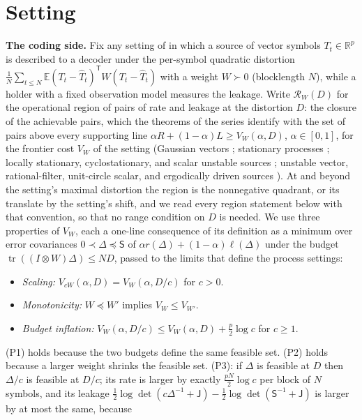 \documentclass[11pt,onecolumn]{IEEEtran}
\newcommand{\E}{\mathbb{E}}
\newcommand{\R}{\mathbb{R}}
\newcommand{\tr}{\operatorname{tr}}
\newcommand{\cR}{\mathcal R}
\begin{document}
\section{Setting}\label{sec:setting}

\textbf{The coding side.} Fix any setting of \cite{part1,part2,part3,part4}
in which a source of vector symbols $T_t\in\R^p$ is described to a decoder
under the per-symbol quadratic distortion
$\tfrac1N\sum_{t\le N}\E(T_t-\hat T_t)^{\mathsf T}W(T_t-\hat T_t)$ with a weight
$W\succ0$ (blocklength $N$), while a holder with a fixed observation model
measures the leakage. Write $\cR_W(D)$ for the operational region of pairs
of rate and leakage at the distortion $D$: the closure of the achievable
pairs, which the theorems of the series identify with the set of pairs
above every supporting line $\alpha R+(1-\alpha)L\ge V_W(\alpha,D)$,
$\alpha\in[0,1]$, for the frontier cost $V_W$ of the setting (Gaussian
vectors \cite{part1}; stationary processes \cite{part2}; locally stationary,
cyclostationary, and scalar unstable sources \cite{part3}; unstable vector,
rational-filter, unit-circle scalar, and ergodically driven sources
\cite{part4}). At and beyond the setting's maximal distortion the region is
the nonnegative quadrant, or its translate by the setting's shift, and we
read every region statement below with that convention, so that no range
condition on $D$ is needed. We use three properties of $V_W$, each a
one-line consequence of its definition as a minimum over error covariances
$0\prec\Delta\preceq\mathsf S$ of $\alpha r(\Delta)+(1-\alpha)\ell(\Delta)$ under
the budget $\tr((I\otimes W)\Delta)\le ND$, passed to the limits that define
the process settings:
\begin{itemize}
\item[(P1)] \emph{Scaling:} $V_{cW}(\alpha,D)=V_W(\alpha,D/c)$ for $c>0$.
\item[(P2)] \emph{Monotonicity:} $W\preceq W'$ implies $V_W\le V_{W'}$.
\item[(P3)] \emph{Budget inflation:} $V_W(\alpha,D/c)\le V_W(\alpha,D)+\tfrac p2\log c$
for $c\ge1$.
\end{itemize}
(P1) holds because the two budgets define the same feasible set. (P2)
holds because a larger weight shrinks the feasible set. (P3): if $\Delta$ is
feasible at $D$ then $\Delta/c$ is feasible at $D/c$; its rate is larger by
exactly $\tfrac{pN}2\log c$ per block of $N$ symbols, and its leakage
$\tfrac12\log\det(c\Delta^{-1}+\mathsf J)-\tfrac12\log\det(\mathsf S^{-1}+\mathsf J)$
is larger by at most the same, because
\end{document}
